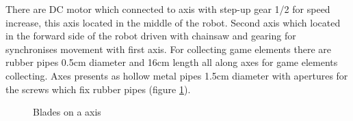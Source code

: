 \begin{enumerate}
	  There are DC motor which connected to axis with step-up gear 1/2 for speed increase, this axis located in the middle of the robot. Second axis which located in the forward side 
	  of the robot driven with chainsaw and gearing for synchronises movement with first axis. For collecting game elements there are rubber pipes 0.5cm diameter and 16cm length all 
	  along axes for game elements collecting. Axes presents as hollow metal pipes 1.5cm diameter with apertures for the screws which fix rubber pipes (figure \ref{Gripper600}).
      \begin{figure}[H]
      	\begin{minipage}[h]{1\linewidth}
      		\caption{Blades on a axis}
      		\label{Gripper600}
      	\end{minipage}
      \end{figure}
      

\end{enumerate}
